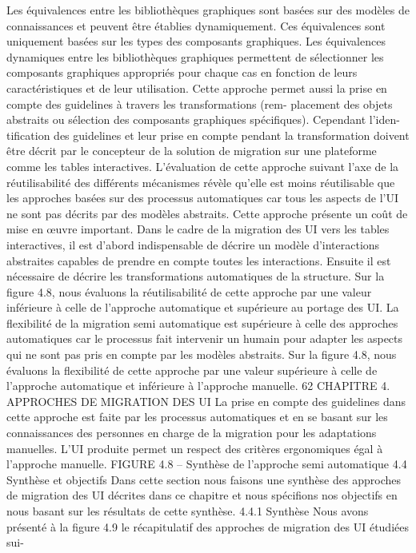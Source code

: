 \documentclass{article}
\begin{document}
Les équivalences entre les bibliothèques graphiques sont basées sur des modèles de connaissances
et peuvent être établies dynamiquement. Ces équivalences sont uniquement basées sur les types des
composants graphiques.
Les équivalences dynamiques entre les bibliothèques graphiques permettent de sélectionner les
composants graphiques appropriés pour chaque cas en fonction de leurs caractéristiques et de leur
utilisation.
Cette approche permet aussi la prise en compte des guidelines à travers les transformations (rem-
placement des objets abstraits ou sélection des composants graphiques spéciﬁques). Cependant l’iden-
tiﬁcation des guidelines et leur prise en compte pendant la transformation doivent être décrit par le
concepteur de la solution de migration sur une plateforme comme les tables interactives.
L’évaluation de cette approche suivant l’axe de la réutilisabilité des différents mécanismes révèle
qu’elle est moins réutilisable que les approches basées sur des processus automatiques car tous les
aspects de l’UI ne sont pas décrits par des modèles abstraits. Cette approche présente un coût de mise
en œuvre important. Dans le cadre de la migration des UI vers les tables interactives, il est d’abord
indispensable de décrire un modèle d’interactions abstraites capables de prendre en compte toutes les
interactions. Ensuite il est nécessaire de décrire les transformations automatiques de la structure. Sur
la ﬁgure 4.8, nous évaluons la réutilisabilité de cette approche par une valeur inférieure à celle de
l’approche automatique et supérieure au portage des UI.
La ﬂexibilité de la migration semi automatique est supérieure à celle des approches automatiques
car le processus fait intervenir un humain pour adapter les aspects qui ne sont pas pris en compte par
les modèles abstraits. Sur la ﬁgure 4.8, nous évaluons la ﬂexibilité de cette approche par une valeur
supérieure à celle de l’approche automatique et inférieure à l’approche manuelle.
62
CHAPITRE 4. APPROCHES DE MIGRATION DES UI
La prise en compte des guidelines dans cette approche est faite par les processus automatiques
et en se basant sur les connaissances des personnes en charge de la migration pour les adaptations
manuelles. L’UI produite permet un respect des critères ergonomiques égal à l’approche manuelle.
FIGURE 4.8 – Synthèse de l’approche semi automatique
4.4
Synthèse et objectifs
Dans cette section nous faisons une synthèse des approches de migration des UI décrites dans ce
chapitre et nous spéciﬁons nos objectifs en nous basant sur les résultats de cette synthèse.
4.4.1
Synthèse
Nous avons présenté à la ﬁgure 4.9 le récapitulatif des approches de migration des UI étudiées sui-
\end{document}

